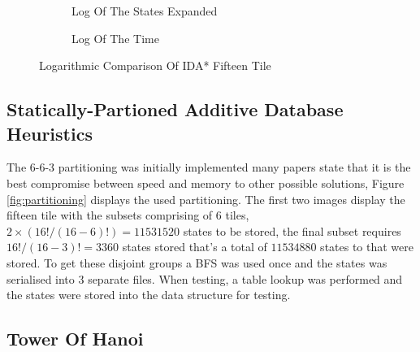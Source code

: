\documentclass[final]{cmpreport}
\begin{document}
\begin{figure}[!ht]
	
	\begin{subfigure}[t]{.5\textwidth}
		\caption{Log Of The States Expanded}
	\end{subfigure}
	\begin{subfigure}[t]{.5\textwidth}
		\caption{Log Of The Time}
	\end{subfigure}
	\caption{Logarithmic Comparison Of IDA* Fifteen Tile}
\end{figure}



\subsection{Statically-Partioned Additive Database Heuristics}
The 6-6-3 partitioning  was initially implemented many papers state that it is the best compromise between speed and memory to other possible solutions, Figure \ref{fig:partitioning} displays the used partitioning. The first two images display the fifteen tile with the subsets comprising of 6 tiles, $2\times(16!/(16-6)!)= 11531520$ states to be stored, the final subset requires $16!/(16-3)!=3360$ states stored that's a total of $11534880$ states to that were stored. To get these disjoint groups a BFS was used once and the states was serialised into 3 separate files. When testing, a table lookup was performed and the states were stored into the data structure for testing.

\subsection{Tower Of Hanoi}
\clearpage



\appendix
\clearpage
\end{document}
